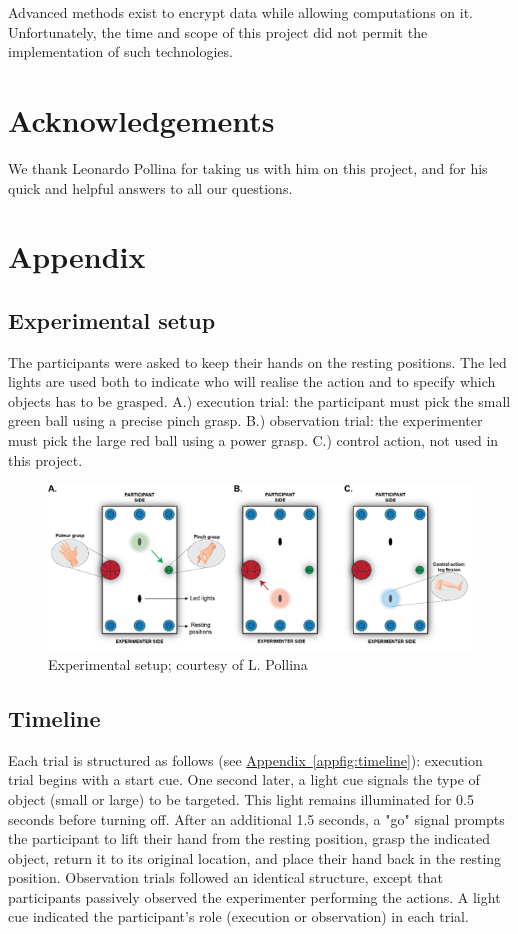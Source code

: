 \documentclass[10pt,conference,compsocconf]{IEEEtran}
\newcommand{\aref}[1]{\hyperref[#1]{Appendix~\ref*{#1}}}
\begin{document}
Advanced methods exist to encrypt data while allowing computations on it\cite{app11167360}. Unfortunately, the time and scope of this project did not permit the implementation of such technologies.


\section*{Acknowledgements}
We thank Leonardo Pollina for taking us with him on this project, and for his quick and helpful answers to all our questions.

\newpage

\section{Appendix}
\subsection{Experimental setup}
The participants were asked to keep their hands on the resting positions. The led lights are used both to indicate who will realise the action and to specify which objects has to be grasped. A.) execution trial: the participant must pick the small green ball using a precise pinch grasp. B.) observation trial: the experimenter must pick the large red ball using a power grasp. C.) control action, not used in this project.

\begin{figure}[h!]
    \center
    \includegraphics[width=\linewidth]{images/2024-12-11-13-41-23.png}
    \caption{Experimental setup; courtesy of L. Pollina}
\end{figure}
\FloatBarrier

\subsection{Timeline}
\label{subsec:timeline}
Each trial is structured as follows (see \aref{appfig:timeline}): execution trial begins with a start cue. One second later, a light cue signals the type of object (small or large) to be targeted. This light remains illuminated for 0.5 seconds before turning off. After an additional 1.5 seconds, a "go" signal prompts the participant to lift their hand from the resting position, grasp the indicated object, return it to its original location, and place their hand back in the resting position. Observation trials followed an identical structure, except that participants passively observed the experimenter performing the actions. A light cue indicated the participant's role (execution or observation) in each trial.
\end{document}
